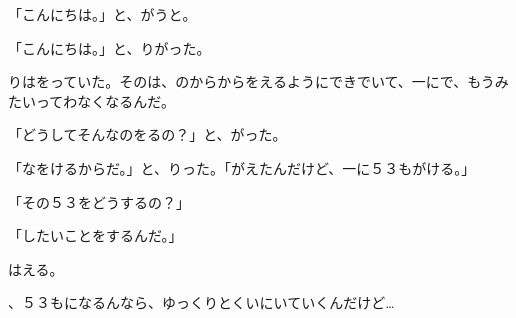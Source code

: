 「こんにちは。」と、がうと。

「こんにちは。」と、りがった。

りはをっていた。そのは、のからからをえるようにできでいて、一にで、もうみたいってわなくなるんだ。

「どうしてそんなのをるの？」と、がった。

「なをけるからだ。」と、りった。「がえたんだけど、一に５３もがける。」

「その５３をどうするの？」

「したいことをするんだ。」

はえる。

、５３もになるんなら、ゆっくりとくいにいていくんだけど…

